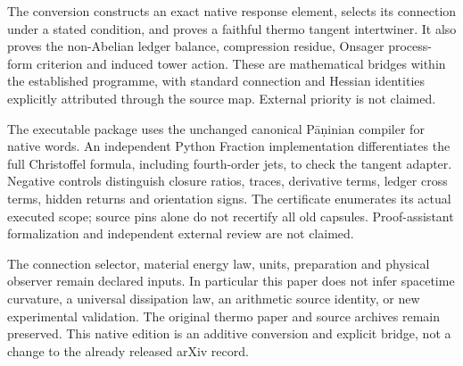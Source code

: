 \documentclass[
  11pt,
]{article}
\begin{document}
The conversion constructs an exact native response element, selects its
connection under a stated condition, and proves a faithful thermo
tangent intertwiner. It also proves the non-Abelian ledger balance,
compression residue, Onsager process-form criterion and induced tower
action. These are mathematical bridges within the established programme,
with standard connection and Hessian identities explicitly attributed
through the source map. External priority is not claimed.

The executable package uses the unchanged canonical Pāṇinian compiler
for native words. An independent Python Fraction implementation
differentiates the full Christoffel formula, including fourth-order
jets, to check the tangent adapter. Negative controls distinguish
closure ratios, traces, derivative terms, ledger cross terms, hidden
returns and orientation signs. The certificate enumerates its actual
executed scope; source pins alone do not recertify all old capsules.
Proof-assistant formalization and independent external review are not
claimed.

The connection selector, material energy law, units, preparation and
physical observer remain declared inputs. In particular this paper does
not infer spacetime curvature, a universal dissipation law, an
arithmetic source identity, or new experimental validation. The original
thermo paper and source archives remain preserved. This native edition
is an additive conversion and explicit bridge, not a change to the
already released arXiv record.
\end{document}
